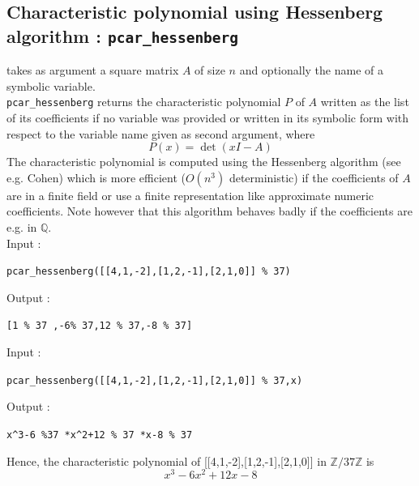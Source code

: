 \documentclass[a4paper,11pt]{book}
\begin{document}
\subsection{Characteristic polynomial using Hessenberg algorithm :
 {\tt pcar\_hessenberg}}
 takes as argument a square 
matrix $A$ of size $n$ and optionally the name of a symbolic variable.\\
{\tt pcar\_hessenberg} returns the characteristic polynomial $P$ of $A$ written
as the list of its coefficients if no variable was provided
or written in its symbolic form with respect to the variable name given 
as second argument, where
\[ P(x)=\det(xI-A) \]
The characteristic polynomial is computed using the Hessenberg algorithm
(see e.g. Cohen) which is more efficient ($O(n^3)$ deterministic) if 
the coefficients of $A$ are in a finite field or use a finite 
representation like approximate numeric coefficients. Note however that
this algorithm behaves badly if the coefficients are e.g. in $\mathbb Q$.\\
Input :
\begin{center}{\tt pcar\_hessenberg([[4,1,-2],[1,2,-1],[2,1,0]] \% 37)}\end{center}
Output :
\begin{center}{\tt[1 \% 37 ,-6\% 37,12 \% 37,-8 \% 37]}\end{center}
Input :
\begin{center}{\tt pcar\_hessenberg([[4,1,-2],[1,2,-1],[2,1,0]] \% 37,x)}\end{center}
Output :
\begin{center}{\tt x\verb|^|3-6 \%37 *x\verb|^|2+12 \% 37 *x-8 \% 37}\end{center}
Hence, the characteristic polynomial of [[4,1,-2],[1,2,-1],[2,1,0]] in
$\mathbb Z/37 \mathbb Z$ is
\[ x^3-6x^2+12x-8 \]
\end{document}
